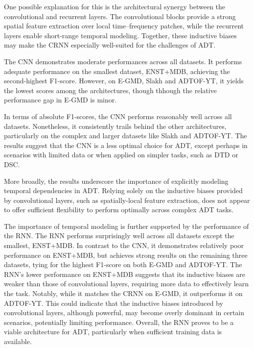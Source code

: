 One possible explanation for this is the architectural synergy between the convolutional and recurrent layers. The convolutional blocks provide a strong spatial feature extraction over local time–frequency patches, while the recurrent layers enable short-range temporal modeling. Together, these inductive biases may make the \gls{CRNN} especially well-suited for the challenges of \gls{ADT}.

The \acrfull{CNN} demonstrates moderate performances across all datasets. It performs adequate performance on the smallest dataset, ENST+MDB, achieving the second-highest F1-score. However, on E-GMD, Slakh and ADTOF-YT, it yields the lowest scores among the architectures, though thhough the relative performance gap in E-GMD is minor. 

In terms of absolute F1-scores, the \gls{CNN} performs reasonably well across all datasets. Nonetheless, it consistently trails behind the other architectures, particularly on the complex and larger datasets like Slakh and ADTOF-YT. The results suggest that the \gls{CNN} is a less optimal choice for \gls{ADT}, except perhaps in scenarios with limited data or when applied on simpler tasks, such as \gls{DTD} or \acrfull{DSC}. 

More broadly, the results underscore the importance of explicitly modeling temporal dependencies in \gls{ADT}. Relying solely on the inductive biases provided by convolutional layers, such as spatially-local feature extraction, does not appear to offer sufficient flexibility to perform optimally across complex \gls{ADT} tasks.

The importance of temporal modeling is further supported by the performance of the \acrlong{RNN}. The \gls{RNN} performs surprisingly well across all datasets except the smallest, ENST+MDB. In contrast to the \gls{CNN}, it demonstrates relatively poor performance on ENST+MDB, but achieves strong results on the remaining three datasets, tying for the highest F1-score on both E-GMD and ADTOF-YT. The \gls{RNN}'s lower performance on ENST+MDB suggests that its inductive biases are weaker than those of convolutional layers, requiring more data to effectively learn the task. Notably, while it matches the \gls{CRNN} on E-GMD, it outperforms it on ADTOF-YT. This could indicate that the inductive biases introduced by convolutional layers, although powerful, may become overly dominant in certain scenarios, potentially limiting performance. Overall, the \gls{RNN} proves to be a viable architecture for \gls{ADT}, particularly when sufficient training data is available.


